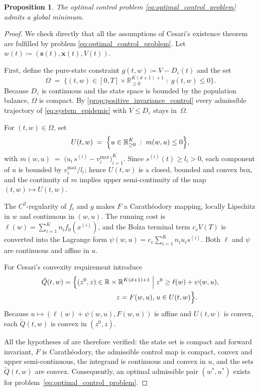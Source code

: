 \documentclass[letterpaper, 10 pt, conference]{ieeeconf}
\newcommand{\R}{\mathbb{R}}
\newtheorem{proposition}{Proposition}
\begin{document}
\begin{proposition}
    \label{prop:existence_model}
    The optimal control problem \eqref{eq:optimal_control_problem} admits a global minimum.
\end{proposition}

\begin{proof}
    We check directly that all the assumptions of Cesari's existence theorem
    \cite[Th.~1]{cesari1965existence} are fulfilled by problem
    \eqref{eq:optimal_control_problem}.
    Let $w(t) \coloneqq (\boldsymbol{s}(t), \boldsymbol{x}(t), V(t))$.

    First, define the pure-state constraint
    \(g(t,w)\coloneqq V-D_\varepsilon(t)\) and the set
    \[
    \Omega\;=\;\{(t,w)\in[0,T]\times\R_{\ge0}^{K(d+1)+1}\;:\;g(t,w)\le0\}.
    \]
    Because \(D_\varepsilon\) is continuous and the state space is bounded by the population balance, \(\Omega\) is compact.  
    By \autoref{prop:positive_invariance_control} every admissible trajectory of \eqref{eq:system_epidemic} with \(V\le D_\varepsilon\) stays in~\(\Omega\).

    For \((t,w)\in\Omega\), set
    \[
    U(t,w)\;=\;\Bigl\{u\in\R_{\ge0}^{K}\;:\;m(w,u)\le0\Bigr\},
    \]
    with $m(w,u)\;=\;\bigl(u_i\,s^{(i)}-v_i^{\max}\bigr)_{i=1}^{K}$.
    Since \(s^{(i)}(t)\ge l_i>0\), each component of \(u\) is bounded by
    \(v_i^{\max}/l_i\); hence \(U(t,w)\) is a closed, bounded and convex box, and the continuity of \(m\) implies upper semi-continuity of the map \((t,w)\mapsto U(t,w)\).

    The \(C^2\)-regularity of \(f_i\) and \(g\) makes \(F\) a Carathéodory mapping, locally Lipschitz in \(w\) and continuous in \((w,u)\).
    The running cost is \(\ell(w)=\sum_{i=1}^{K} n_i f_0(x^{(i)})\),
    and the Bolza terminal term \(c_v V(T)\) is converted into the Lagrange form \(\psi(w,u)=c_v\sum_{i=1}^{K} n_i u_i s^{(i)}\).
    Both \(\ell\) and \(\psi\) are continuous and affine in \(u\).

    For Cesari's convexity requirement introduce
    {\small \begin{align}
    \tilde Q(t,w)=\Bigl\{(z^0,z)\in\R\times\R^{K(d+1)+1}\Bigm|\;
    & z^0\ge \ell(w)+\psi(w,u),\nonumber\\
     z = F(w,u),\; &u\in U(t,w)\Bigr\}.
    \end{align}}
    Because \(u\mapsto(\ell(w)+\psi(w,u),F(w,u))\) is affine and \(U(t,w)\) is convex, each \(\tilde Q(t,w)\) is convex in \((z^0,z)\).

    All the hypotheses of \cite[Th.~1]{cesari1965existence} are therefore verified: the state set is compact and forward invariant, \(F\) is Carathéodory, the admissible control map is compact, convex and upper semi-continuous, the integrand is continuous and convex in \(u\), and the sets \(\tilde Q(t,w)\) are convex.
    Consequently, an optimal admissible pair \((w^\ast,u^\ast)\) exists for problem~\eqref{eq:optimal_control_problem}.
\end{proof}
\end{document}
